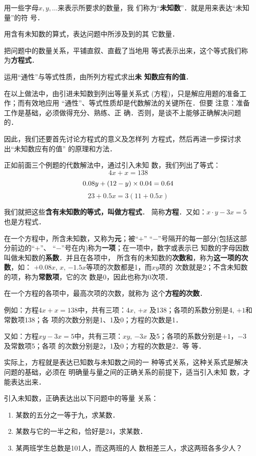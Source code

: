     用一些字母$x,  y,\ldots$来表示所要求的数量，我
们称为“\textbf{未知数}”．就是用来表达“未知量”的符
号．

    用含有未知数的算式，表达问题中所涉及到的其
它数量．

    把问题中的数量关系，平铺直叙、直截了当地用
等式表示出来，这个等式我们称为\textbf{方程式}．

    运用“通性”与等式性质，由所列方程式求出\textbf{未
知数应有的值}．

    在以上做法中，由引进未知数到列出等量关系式
  (方程)，只是解应用题的准备工作；而有效地应用
  “通性”、等式性质却是代数解法的关键所在．但要
注意：准备工作是基础，必须做得充分、熟练、正
确．否则，是谈不上能够正确解决问题的．

    因此，我们还要首先讨论方程式的意义及怎样列
方程式，然后再进一步探讨求出“未知数应有的值”
的原理和方法．

    正如前面三个例题的代数解法中，通过引入未知
数，我们列出了等式：
\[4x+x=138\]
\[0.08y+(12-y)\times 0.04=0.64\]
\[23+0.5x=3(11+0.5x)\]

我们就把这些\textbf{含有未知数的等式，叫做方程式}．
简称\textbf{方程}．又如：$x\cdot y-3x=5$也是方程式．

在一个方程中，所含未知数，又称为\textbf{元}；被“$+$”
“$-$”号隔开的每一部分(包括这部分前边的“$+$”、
“$-$”号在内)称为\textbf{一项}；在一项中，数字或表示已
知数的字母因数叫做未知数的\textbf{系数}．并且在各项中，
所含有的未知数的\textbf{次数和}，称为\textbf{这一项的次数}，如：
$+ 0. 08x$,  $x$, $-1.5x$等项的次数都是1，而$xy$项的
次数就是2；不含未知数的项，称为\textbf{常数项}，它的次
数是0，因此也称为0次项．

  在一个方程的各项中，最高次项的次数，就称为
这个\textbf{方程的次数}．

  例如：方程$4x+x=138$中，共有三项：$4 x$, $+x$
及138；各项的系数分别是4, $+1$和常数项138；各
项的次数分别是1、1及0；方程的次数是1．

  又如：方程$xy-3x=5$中，共有三项：$xy$, $-3x$
及5；各项的系数分别是$+1$，$-3$及常数项5；各项
的次数分别是2，1及0；方程的次数是2．等
等．

  实际上，方程就是表达已知数与未知数之间的一
种等式关系，这种关系式是解决问题的基础，必须在
明确量与量之间的正确关系的前提下，适当引入未知
数，才能表达出来．

\begin{example}
引入未知数，正确表达出以下问题中的等量
关系：
\begin{enumerate}
    \item 某数的五分之一等于九，求某数．
    \item 某数与它的一半之和，恰好是24，求某数．
    \item 某两班学生总数是101人，而这两班的人
    数相差三人，求这两班各多少人？
\end{enumerate}
\end{example}

